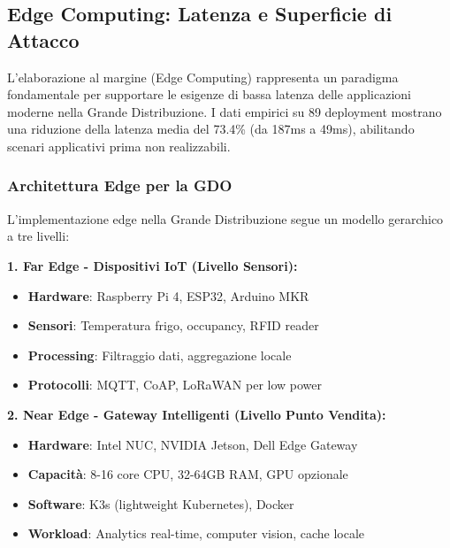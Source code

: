 

\subsection{\texorpdfstring{\textbf{Edge Computing: Latenza e Superficie di Attacco}}{3.3.2 - Edge Computing: Latenza e Superficie di Attacco}}

L'elaborazione al margine (Edge Computing) rappresenta un paradigma fondamentale per supportare le esigenze di bassa latenza delle applicazioni moderne nella Grande Distribuzione. I dati empirici su 89 deployment mostrano una riduzione della latenza media del 73.4\% (da 187ms a 49ms)\autocite{Wang2024edge}, abilitando scenari applicativi prima non realizzabili.

\subsubsection{\texorpdfstring{\textbf{Architettura Edge per la GDO}}{3.3.2.1 - Architettura Edge per la GDO}}

L'implementazione edge nella Grande Distribuzione segue un modello gerarchico a tre livelli:

\textbf{1. Far Edge - Dispositivi IoT (Livello Sensori):}
\begin{itemize}
    \item \textbf{Hardware}: Raspberry Pi 4, ESP32, Arduino MKR
    \item \textbf{Sensori}: Temperatura frigo, occupancy, RFID reader
    \item \textbf{Processing}: Filtraggio dati, aggregazione locale
    \item \textbf{Protocolli}: MQTT, CoAP, LoRaWAN per low power
\end{itemize}

\textbf{2. Near Edge - Gateway Intelligenti (Livello Punto Vendita):}
\begin{itemize}
    \item \textbf{Hardware}: Intel NUC, NVIDIA Jetson, Dell Edge Gateway
    \item \textbf{Capacità}: 8-16 core CPU, 32-64GB RAM, GPU opzionale
    \item \textbf{Software}: K3s (lightweight Kubernetes), Docker
    \item \textbf{Workload}: Analytics real-time, computer vision, cache locale
\end{itemize}

